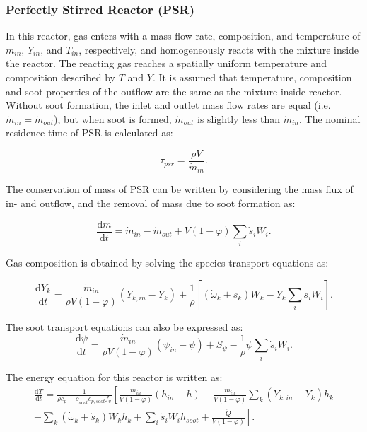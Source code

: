 \subsubsection{Perfectly Stirred Reactor (PSR)}
In this reactor, gas enters with a mass flow rate, composition, and temperature of $\dot{m}_{in}$, $Y_{in}$, and $T_{in}$, respectively, and homogeneously reacts with the mixture inside the reactor. The reacting gas reaches a spatially uniform temperature and composition described by $T$ and $Y$. It is assumed that temperature, composition and soot properties of the outflow are the same as the mixture inside reactor. Without soot formation, the inlet and outlet mass flow rates are equal (i.e. ${\dot{m}_{in}}={\dot{m}_{out}}$), but when soot is formed, ${\dot{m}_{out}}$ is slightly less than ${\dot{m}_{in}}$. The nominal residence time of PSR is calculated as:

\begin{equation}
	\tau_{psr} = \frac{\rho V}{\dot{m}_{in}}
	\label{eqn:taupsr}.
\end{equation} 

The conservation of mass of PSR can be written by considering the mass flux of in- and outflow, and the removal of mass due to soot formation as:

\begin{equation}
	\frac{\mathrm{d} m}{\mathrm{d} t}
	=
	\dot{m}_{in} - \dot{m}_{out} 
	+ V(1 - \varphi)\sum_i \dot{s}_i W_i 
	\label{eqn:contpsr}.
\end{equation}

Gas composition is obtained by solving the species transport equations as:

\begin{equation}
	\frac{\mathrm{d} Y_k}{\mathrm{d} t}
	=
	\frac{{\dot{m}}_{in}}{\rho V
	\left(1-\varphi\right)}
	\left(Y_{k,in}-Y_k \right)+
	\frac{1}{\rho}\left[\left(\dot{\omega}_k+\dot{s}_k\right) W_k-Y_k \sum_i \dot{s}_i W_i\right]
	\label{eqn:speciespsr}.
\end{equation}

The soot transport equations can also be expressed as:
\begin{equation}
	\frac{\mathrm{d}\psi}{\mathrm{d}t}
	=
	\frac{{\dot{m}}_{in}}{\rho V
		\left(1-\varphi\right)}
	\left(\psi_{in}-\psi\right)
	+
	S_{\psi}
	-\frac{1}{\rho}\psi\sum_{i}{{\dot{s}}_i W_i}
	\label{eqn:sootpsr}.
\end{equation}

The energy equation for this reactor is written as:
\begin{equation}
	\begin{split}
		\frac{\mathrm{d}T}{\mathrm{d}t}
		=
		\frac{1}
		{
			\rho c_p+\rho_{soot}c_{p,soot}f_v
		}
		\left[
		\frac{{\dot{m}}_{in}}{V(1 - \varphi)}
		\left(h_{in}-h\right)
		-
		\frac{{\dot{m}}_{in}}{V (1 - \varphi)}\sum_{k}\left(Y_{k,in}-Y_k\right)h_k
		\right.\\
		\left.	
		-
		\sum_{k}{
			\left(
			{\dot{\omega}}_k
			+
			{\dot{s}}_k
			\right) W_k h_k}
		+\sum_{i}{{\dot{s}}_i W_i} h_{soot}+\frac{\dot{Q}}{V(1 - \varphi)}
		\right].
	\end{split}
		\label{eqn:energypsr}
\end{equation}



